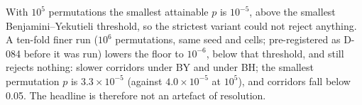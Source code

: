 With $10^{5}$ permutations the smallest attainable $p$ is $10^{-5}$, above the smallest Benjamini--Yekutieli threshold, so the strictest variant could not reject anything. A ten-fold finer run ($10^{6}$ permutations, same seed and cells; pre-registered as D-084 before it was run) lowers the floor to $10^{-6}$, below that threshold, and still rejects nothing: \fzAuditFineByPermSlower{} slower corridors under BY and \fzAuditFineBhPermSlower{} under BH; the smallest permutation $p$ is $3.3\times10^{-5}$ (against $4.0\times10^{-5}$ at $10^{5}$), and \fzAuditFinePBelowFivePct{} corridors fall below 0.05. The headline is therefore not an artefact of resolution.
